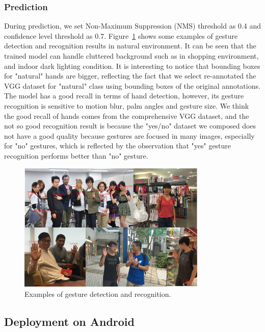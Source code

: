 \subsubsection{Prediction}
During prediction, we set Non-Maximum Suppression (NMS) threshold as 0.4 and confidence level threshold as 0.7. Figure~\ref{fig:ch4-gestpredictemp} shows some examples of gesture detection and recognition results in natural environment. It can be seen that the trained model can handle cluttered background such as in shopping environment, and indoor dark lighting condition. It is interesting to notice that bounding boxes for "natural" hands are bigger, reflecting the fact that we select re-annotated the VGG dataset for "natural" class using bounding boxes of the original annotations. The model has a good recall in terms of hand detection, however, its gesture recognition is sensitive to motion blur, palm angles and gesture size. We think the good recall of hands comes from the comprehensive VGG dataset, and the not so good recognition result is because the "yes/no" dataset we composed does not have a good quality because gestures are focused in many images, especially for "no" gestures, which is reflected by the observation that "yes" gesture recognition performs better than "no" gesture.

\begin{figure}[!htbp]
    \centering
    \includegraphics[width=0.8\textwidth]{figure/ch4-gestpredemp.png}
    \caption{Examples of gesture detection and recognition.}
    \label{fig:ch4-gestpredictemp}
\end{figure}




\subsection{Deployment on Android}

